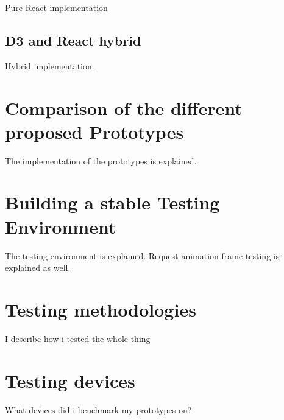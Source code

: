 Pure React implementation

\subsection{D3 and React hybrid}


Hybrid implementation.

\section{Comparison of the different proposed Prototypes}

The implementation of the prototypes is explained.

\section{Building a stable Testing Environment}

The testing environment is explained. Request animation frame testing is explained as well.

\section{Testing methodologies}

I describe how i tested the whole thing

\section{Testing devices}

What devices did i benchmark my prototypes on?
